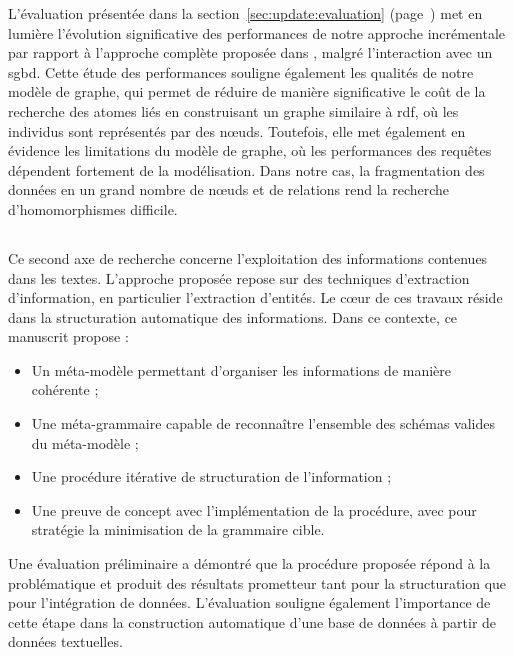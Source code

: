 L'évaluation présentée dans la section~\ref{sec:update:evaluation} (page~\pageref{sec:update:evaluation}) met en lumière l'évolution significative des performances de notre approche incrémentale par rapport à l'approche complète proposée dans \cite{chabinConsistentUpdatingDatabases2020}, malgré l'interaction avec un \gls{sgbd}.
Cette étude des performances souligne également les qualités de notre modèle de graphe, qui permet de réduire de manière significative le coût de la recherche des atomes liés en construisant un graphe similaire à \acrshort{rdf}, où les individus sont représentés par des nœuds.
Toutefois, elle met également en évidence les limitations du modèle de graphe, où les performances des requêtes dépendent fortement de la modélisation.
Dans notre cas, la fragmentation des données en un grand nombre de nœuds et de relations rend la recherche d'homomorphismes difficile.

\subsection{}

Ce second axe de recherche concerne l'exploitation des informations contenues dans les textes.
L'approche proposée repose sur des techniques d'extraction d'information, en particulier l'extraction d'entités.
Le cœur de ces travaux réside dans la structuration automatique des informations.
Dans ce contexte, ce manuscrit propose :
\begin{itemize}
    \item Un méta-modèle permettant d'organiser les informations de manière cohérente ;

    \item Une méta-grammaire capable de reconnaître l'ensemble des schémas valides du méta-modèle ;

    \item Une procédure itérative de structuration de l'information ;

    \item Une preuve de concept avec l'implémentation de la procédure, avec pour stratégie la minimisation de la grammaire cible.
\end{itemize}

Une évaluation préliminaire a démontré que la procédure proposée répond à la problématique et produit des résultats prometteur tant pour la structuration que pour l'intégration de données.
L'évaluation souligne également l'importance de cette étape dans la construction automatique d'une base de données à partir de données textuelles.


